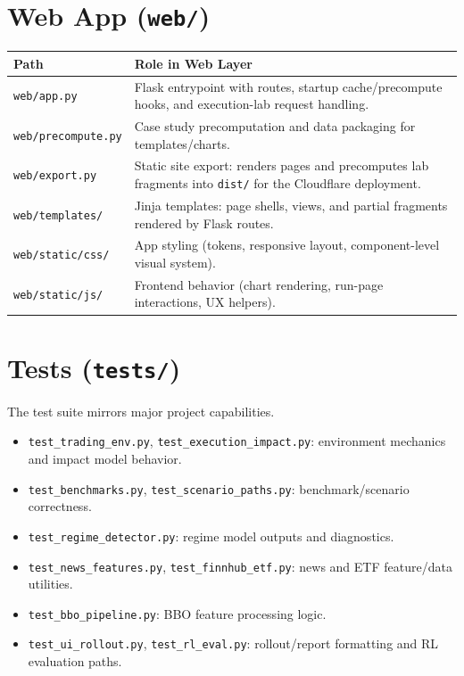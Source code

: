 \documentclass[11pt]{article}
\begin{document}
\section{Web App (\texttt{web/})}
\begin{longtable}{>{\raggedright\arraybackslash}p{} >{\raggedright\arraybackslash}p{}}
\textbf{Path} & \textbf{Role in Web Layer} \\
\hline
\texttt{web/app.py} & Flask entrypoint with routes, startup cache/precompute hooks, and execution-lab request handling. \\
\texttt{web/precompute.py} & Case study precomputation and data packaging for templates/charts. \\
\texttt{web/export.py} & Static site export: renders pages and precomputes lab fragments into \texttt{dist/} for the Cloudflare deployment. \\
\texttt{web/templates/} & Jinja templates: page shells, views, and partial fragments rendered by Flask routes. \\
\texttt{web/static/css/} & App styling (tokens, responsive layout, component-level visual system). \\
\texttt{web/static/js/} & Frontend behavior (chart rendering, run-page interactions, UX helpers). \\
\end{longtable}

\section{Tests (\texttt{tests/})}
The test suite mirrors major project capabilities.
\begin{itemize}[leftmargin=1.2em]
    \item \texttt{test\_trading\_env.py}, \texttt{test\_execution\_impact.py}: environment mechanics and impact model behavior.
    \item \texttt{test\_benchmarks.py}, \texttt{test\_scenario\_paths.py}: benchmark/scenario correctness.
    \item \texttt{test\_regime\_detector.py}: regime model outputs and diagnostics.
    \item \texttt{test\_news\_features.py}, \texttt{test\_finnhub\_etf.py}: news and ETF feature/data utilities.
    \item \texttt{test\_bbo\_pipeline.py}: BBO feature processing logic.
    \item \texttt{test\_ui\_rollout.py}, \texttt{test\_rl\_eval.py}: rollout/report formatting and RL evaluation paths.
\end{itemize}
\end{document}
